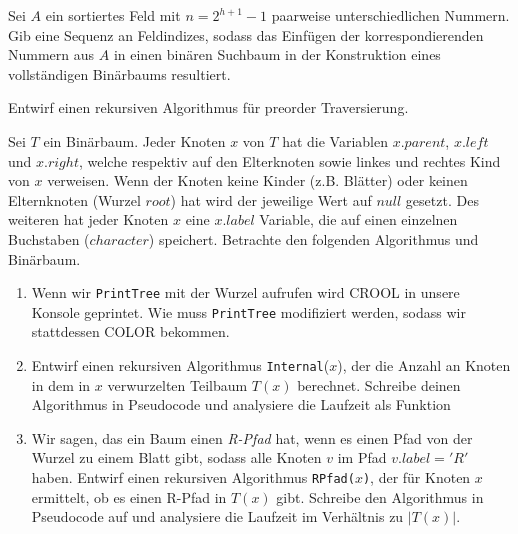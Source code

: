 \documentclass{uebung_cs}
\begin{document}
\begin{aufgabe}
	Sei $A$ ein sortiertes Feld mit $n = 2^{h+1}-1$ paarweise unterschiedlichen Nummern.
	Gib eine Sequenz an Feldindizes, sodass das Einfügen der korrespondierenden Nummern aus $A$ in einen binären Suchbaum in der Konstruktion eines vollständigen Binärbaums resultiert.
\end{aufgabe}

\begin{aufgabe}
	Entwirf einen rekursiven Algorithmus für preorder Traversierung.
\end{aufgabe}

\begin{aufgabe}
	Sei $T$ ein Binärbaum.
	Jeder Knoten $x$ von $T$ hat die Variablen $x.parent$, $x.left$ und $x.right$, welche respektiv auf den Elterknoten sowie linkes und rechtes Kind von $x$ verweisen.
	Wenn der Knoten keine Kinder (z.B. Blätter) oder keinen Elternknoten (Wurzel $root$) hat wird der jeweilige Wert auf $null$ gesetzt.
	Des weiteren hat jeder Knoten $x$ eine $x.label$ Variable, die auf einen einzelnen Buchstaben ($character$) speichert.
	Betrachte den folgenden Algorithmus und Binärbaum.
	\begin{algorithmic}
			\ENDIF
			\ENDIF
		\ENDIF
	\end{algorithmic}
		
	\begin{enumerate}
		\item Wenn wir \texttt{PrintTree} mit der Wurzel aufrufen wird \glqq CROOL\grqq{} in unsere Konsole geprintet.
		Wie muss \texttt{PrintTree} modifiziert werden, sodass wir stattdessen \glqq COLOR\grqq{} bekommen.
		\item Entwirf einen rekursiven Algorithmus \texttt{Internal}($x$), der die Anzahl an Knoten in dem in $x$ verwurzelten Teilbaum $T(x)$ berechnet.
		Schreibe deinen Algorithmus in Pseudocode und analysiere die Laufzeit als Funktion 
		\item Wir sagen, das ein Baum einen \textit{R-Pfad} hat, wenn es einen Pfad von der Wurzel zu einem Blatt gibt, sodass alle Knoten $v$ im Pfad $v.label = 'R'$ haben.
		Entwirf einen rekursiven Algorithmus \texttt{RPfad($x$)}, der für Knoten $x$ ermittelt, ob es einen R-Pfad in $T(x)$ gibt.
		Schreibe den Algorithmus in Pseudocode auf und analysiere die Laufzeit im Verhältnis zu $|T(x)|$.
	\end{enumerate}
\end{aufgabe}
\end{document}

